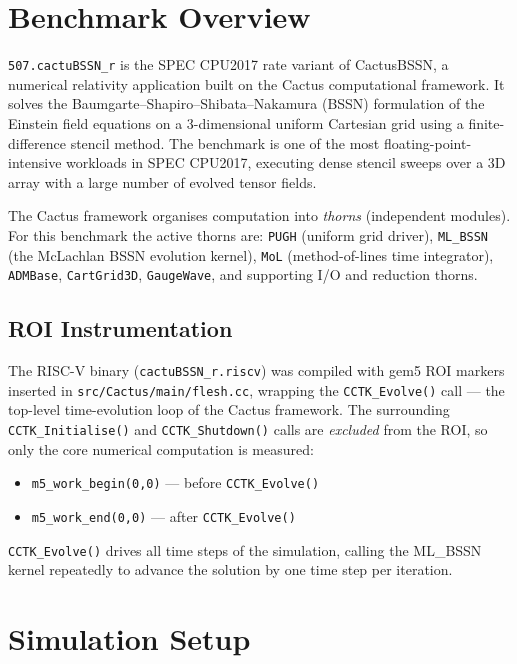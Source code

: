 \documentclass[conference]{IEEEtran}
\begin{document}
\section{Benchmark Overview}

\texttt{507.cactuBSSN\_r} is the SPEC CPU2017 rate variant of
CactusBSSN, a numerical relativity application built on the
Cactus computational framework. It solves the
Baumgarte--Shapiro--Shibata--Nakamura (BSSN) formulation of the
Einstein field equations on a 3-dimensional uniform Cartesian grid
using a finite-difference stencil method. The benchmark is one of
the most floating-point-intensive workloads in SPEC CPU2017,
executing dense stencil sweeps over a 3D array with a large number
of evolved tensor fields.

The Cactus framework organises computation into \emph{thorns}
(independent modules). For this benchmark the active thorns are:
\texttt{PUGH} (uniform grid driver), \texttt{ML\_BSSN} (the McLachlan
BSSN evolution kernel), \texttt{MoL} (method-of-lines time integrator),
\texttt{ADMBase}, \texttt{CartGrid3D}, \texttt{GaugeWave}, and
supporting I/O and reduction thorns.

\subsection{ROI Instrumentation}

The RISC-V binary (\texttt{cactuBSSN\_r.riscv}) was compiled with gem5
ROI markers inserted in \texttt{src/Cactus/main/flesh.cc}, wrapping
the \texttt{CCTK\_Evolve()} call --- the top-level time-evolution
loop of the Cactus framework. The surrounding \texttt{CCTK\_Initialise()}
and \texttt{CCTK\_Shutdown()} calls are \emph{excluded} from the ROI,
so only the core numerical computation is measured:

\begin{itemize}
    \item \texttt{m5\_work\_begin(0,0)} --- before \texttt{CCTK\_Evolve()}
    \item \texttt{m5\_work\_end(0,0)}   --- after  \texttt{CCTK\_Evolve()}
\end{itemize}

\texttt{CCTK\_Evolve()} drives all time steps of the simulation, calling
the ML\_BSSN kernel repeatedly to advance the solution by one time step
per iteration.

\section{Simulation Setup}
\end{document}
